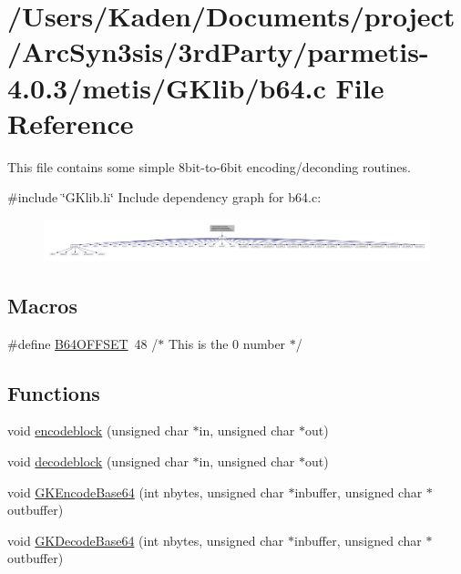 \hypertarget{a00014}{}\section{/\+Users/\+Kaden/\+Documents/project/\+Arc\+Syn3sis/3rd\+Party/parmetis-\/4.0.3/metis/\+G\+Klib/b64.c File Reference}
\label{a00014}


This file contains some simple 8bit-\/to-\/6bit encoding/deconding routines.  


{\ttfamily \#include \char`\"{}G\+Klib.\+h\char`\"{}}\newline
Include dependency graph for b64.\+c\+:\nopagebreak
\begin{figure}[H]
\begin{center}
\leavevmode
\includegraphics[width=350pt]{a00015}
\end{center}
\end{figure}
\subsection*{Macros}
\begin{DoxyCompactItemize}
\item 
\#define \hyperlink{a00014_a02bce60efacf71903875f4ad8e01b2f8}{B64\+O\+F\+F\+S\+ET}~48      /$\ast$ This is the \textquotesingle{}0\textquotesingle{} number $\ast$/
\end{DoxyCompactItemize}
\subsection*{Functions}
\begin{DoxyCompactItemize}
\item 
void \hyperlink{a00014_a9196de4bd8fefa1d09e0d4a273dedde5}{encodeblock} (unsigned char $\ast$in, unsigned char $\ast$out)
\item 
void \hyperlink{a00014_a16b79810a7cfac6a5bc729e7bea80f7b}{decodeblock} (unsigned char $\ast$in, unsigned char $\ast$out)
\item 
void \hyperlink{a00014_a63253b29fd38d41463013481ce7e7f0a}{G\+K\+Encode\+Base64} (int nbytes, unsigned char $\ast$inbuffer, unsigned char $\ast$outbuffer)
\item 
void \hyperlink{a00014_a489bc1aa604dc1c8bc1fcb4e404de26a}{G\+K\+Decode\+Base64} (int nbytes, unsigned char $\ast$inbuffer, unsigned char $\ast$outbuffer)
\end{DoxyCompactItemize}


